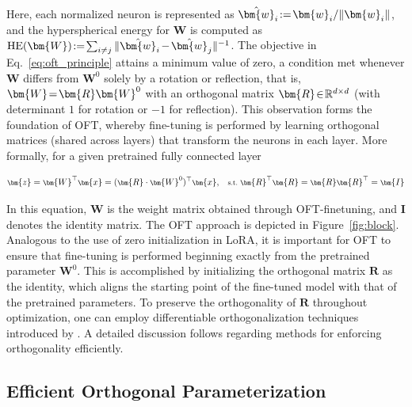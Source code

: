 Here, each normalized neuron is represented as $\thickmuskip=2mu \medmuskip=2mu \hat{\bm{w}}_i:=\bm{w}_i/\|\bm{w}_i\|$, and the hyperspherical energy for $\bm{W}$ is computed as $\thickmuskip=2mu \medmuskip=2mu \text{HE}(\bm{W}):= \sum_{i\neq j} \|\hat{\bm{w}}_i-\hat{\bm{w}}_j\|^{-1}$. The objective in Eq.~\eqref{eq:oft_principle} attains a minimum value of zero, a condition met whenever $\bm{W}$ differs from $\bm{W}^0$ solely by a rotation or reflection, that is, $\thickmuskip=2mu \medmuskip=2mu \bm{W}=\bm{R}\bm{W}^0$ with an orthogonal matrix $\thickmuskip=2mu \medmuskip=2mu \bm{R}\in\mathbb{R}^{d\times d}$ (with determinant $1$ for rotation or $-1$ for reflection). This observation forms the foundation of OFT, whereby fine-tuning is performed by learning orthogonal matrices (shared across layers) that transform the neurons in each layer. More formally, for a given pretrained fully connected layer

\begin{equation}\label{eq:oft_general}
    \footnotesize
    \bm{z}=\bm{W}^\top\bm{x}=(\bm{R}\cdot\bm{W}^0)^\top\bm{x},~~~\text{s.t.}~\bm{R}^\top\bm{R}=\bm{R}\bm{R}^\top=\bm{I}
\end{equation}

In this equation, $\bm{W}$ is the weight matrix obtained through OFT-finetuning, and $\bm{I}$ denotes the identity matrix. The OFT approach is depicted in Figure~\ref{fig:block}. Analogous to the use of zero initialization in LoRA, it is important for OFT to ensure that fine-tuning is performed beginning exactly from the pretrained parameter $\bm{W}^0$. This is accomplished by initializing the orthogonal matrix $\bm{R}$ as the identity, which aligns the starting point of the fine-tuned model with that of the pretrained parameters. To preserve the orthogonality of $\bm{R}$ throughout optimization, one can employ differentiable orthogonalization techniques introduced by \cite{liu2021orthogonal,lezcano2019cheap}. A detailed discussion follows regarding methods for enforcing orthogonality efficiently.

\subsection{Efficient Orthogonal Parameterization}\label{sect:eff_ortho}

